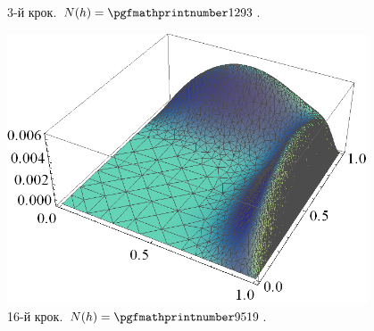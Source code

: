 \begin{frame}[allowframebreaks]
\begin{figure}[H]
\begin{columns}
\begin{column}{0.7\textwidth}
			 	 \end{column}
			     \begin{column}{0.3\textwidth}
			     	\caption*{3-й крок. $N(h) = \nn{1293}$.}
			     \end{column}
		     \end{columns}
		\end{figure}
		\begin{figure}[H]
			\begin{columns}
			 	\begin{column}{0.7\textwidth}
			 		\includegraphics[width=\textwidth]{problem2/my/solutions/solution16}
			 	 \end{column}
			     \begin{column}{0.3\textwidth}
			     	\caption*{16-й крок. $N(h) = \nn{9519}$.}
			     \end{column}
		     \end{columns}
		\end{figure}
\end{frame}


